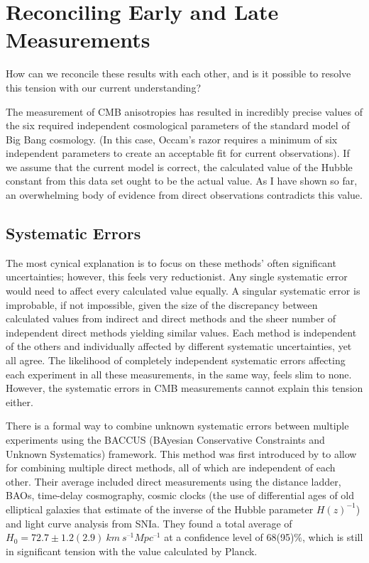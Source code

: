 \documentclass[12pt]{report}
\begin{document}
\chapter{Reconciling Early and Late Measurements}

\vspace{-0.75cm}

How can we reconcile these results with each other, and is it possible to resolve this tension with our current understanding? 

The measurement of CMB anisotropies has resulted in incredibly precise values of the six required independent cosmological parameters of the standard model of Big Bang cosmology. (In this case, Occam's razor requires a minimum of six independent parameters to create an acceptable fit for current observations). If we assume that the current model is correct, the calculated value of the Hubble constant from this data set ought to be the actual value. As I have shown so far, an overwhelming body of evidence from direct observations contradicts this value.

\section{Systematic Errors}

The most cynical explanation is to focus on these methods' often significant uncertainties; however, this feels very reductionist. Any single systematic error would need to affect every calculated value equally. A singular systematic error is improbable, if not impossible, given the size of the discrepancy between calculated values from indirect and direct methods and the sheer number of independent direct methods yielding similar values. Each method is independent of the others and individually affected by different systematic uncertainties, yet all agree. The likelihood of completely independent systematic errors affecting each experiment in all these measurements, in the same way, feels slim to none. However, the systematic errors in CMB measurements cannot explain this tension either. 

There is a formal way to combine unknown systematic errors between multiple experiments using the BACCUS (BAyesian Conservative Constraints and Unknown Systematics) framework. This method was first introduced by \textcite{Bernal2018} to allow for combining multiple direct methods, all of which are independent of each other. Their average included direct measurements using the distance ladder, BAOs, time-delay cosmography, cosmic clocks (the use of differential ages of old elliptical galaxies that estimate of the inverse of the Hubble parameter $H(z)^{-1}$) and light curve analysis from SNIa. They found a total average of $H_{0} = 72.7 \pm 1.2(2.9) \ km \ s^{–1} Mpc^{–1}$ at a confidence level of 68(95)\%, which is still in significant tension with the value calculated by Planck. 
 
\end{document}
